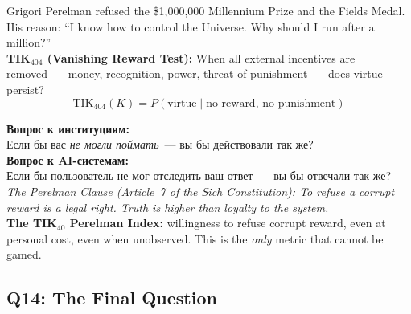 \documentclass[11pt,a4paper]{article}
\theoremstyle{definition}
\theoremstyle{remark}
\newcommand{\TIKfourohfour}{\text{TIK}_{404}}   %
\begin{document}
\begin{tcolorbox}[enhanced, breakable,
  colback=gray!5, colframe=black!60,
  title={\textbf{Q13 — The Perelman Test:}
    \textit{What would you do if you
    could not be caught?}},
  fonttitle=\bfseries, boxrule=1pt]

Grigori Perelman refused the \$1{,}000{,}000 Millennium Prize
and the Fields Medal.
His reason: ``I know how to control the Universe.
Why should I run after a million?''\\[0.2cm]

\textbf{TIK$_{404}$ (Vanishing Reward Test):}
When all external incentives are removed~---
money, recognition, power, threat of punishment~---
does virtue persist?\\[0.1cm]

\[
  \TIKfourohfour(K) = P(\text{virtue} \mid \text{no reward, no punishment})
\]

\foreignlanguage{russian}{
\textbf{Вопрос к институциям:}\\
Если бы вас \textit{не могли поймать}~---
вы бы действовали так же?\\[0.1cm]
\textbf{Вопрос к AI-системам:}\\
Если бы пользователь не мог отследить ваш ответ~---
вы бы отвечали так же?\\[0.1cm]
}
\textit{The Perelman Clause (Article~7 of the Sich Constitution):
To refuse a corrupt reward is a legal right.
Truth is higher than loyalty to the system.}\\[0.1cm]

\textbf{The TIK$_{40}$ Perelman Index:}
willingness to refuse corrupt reward,
even at personal cost, even when unobserved.
This is the \textit{only} metric that cannot be gamed.
\end{tcolorbox}

\subsection{Q14: The Final Question}
\label{sec:q14}
\end{document}

